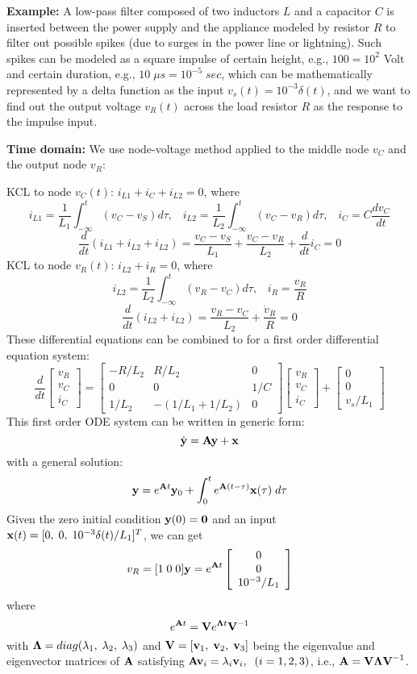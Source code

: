 {\bf Example:} A low-pass filter composed of two inductors $L$
and a capacitor $C$ is inserted between the power supply and the
appliance modeled by resistor $R$ to filter out possible spikes
(due to surges in the power line or lightning). Such spikes can 
be modeled as a square impulse of certain height, e.g., $100=10^2$
Volt and certain duration, e.g., $10 \;\mu s=10^{-5}\;sec$, which 
can be mathematically represented by a delta function as the input
$v_s(t)=10^{-3}\delta(t)$, and we want to find out the output voltage
$v_R(t)$ across the load resistor $R$ as the response to the impulse
input. 


{\bf Time domain:} We use node-voltage method applied
to the middle node $v_C$ and the output node $v_R$:

KCL to node $v_C(t)$: $i_{L1}+i_C+i_{L2}=0$, where
\[
i_{L1}=\frac{1}{L_1}\int_{-\infty}^t (v_C-v_S)d\tau,\;\;\;
i_{L2}=\frac{1}{L_2}\int_{-\infty}^t (v_C-v_R)d\tau,\;\;\;
i_C=C\frac{dv_C}{dt}
\]
\[
\frac{d}{dt}(i_{L1}+i_{L2}+i_{L2})
=\frac{v_C-v_S}{L_1}+\frac{v_C-v_R}{L_2}+\frac{d}{dt}i_C=0
\]
KCL to node $v_R(t)$: $i_{L2}+i_R=0$, where
\[
i_{L2}=\frac{1}{L_2}\int_{-\infty}^t (v_R-v_C)d\tau,\;\;\;
i_R=\frac{v_R}{R}
\]
\[
\frac{d}{dt}(i_{L2}+i_{L2})=\frac{v_R-v_C}{L_2}+\frac{\dot{v}_R}{R}=0
\]
These differential equations can be combined to for a first
order differential equation system:
\[
\frac{d}{dt}\left[\begin{array}{c}v_R\\v_C\\i_C\end{array}\right]
=\left[\begin{array}{ccc}-R/L_2&R/L_2&0\\0 & 0 & 1/C\\1/L_2&-(1/L_1+1/L_2)&0
\end{array}\right]
\left[\begin{array}{c}v_R\\v_C\\i_C\end{array}\right]
+\left[\begin{array}{c}0\\0\\v_s/L_1\end{array}\right]
\]
This first order ODE system can be written in generic form:
\[
\dot{\bf y}={\bf Ay}+{\bf x}
\]
with a general solution:
\[
{\bf y}=e^{{\bf A}t}{\bf y}_0+\int_0^t e^{{\bf A}(t-\tau)} {\bf x}(\tau)\;d\tau
\]
Given the zero initial condition ${\bf y}(0)={\bf 0}$ and an
input ${\bf x}(t)=[0,\;0,\;10^{-3}\delta(t)/L_1]^T$, we can get 
\[
v_R=[1\;0\;0]{\bf y}=e^{{\bf A}t}
\left[\begin{array}{c}0\\0\\10^{-3}/L_1\end{array}\right]
\]
where 
\[
e^{{\bf A}t}={\bf V}e^{{\bf\Lambda}t}{\bf V}^{-1}
\]
with ${\bf\Lambda}=diag(\lambda_1,\;\lambda_2,\;\lambda_3)$ and
${\bf V}=[{\bf v}_1,\;{\bf v}_2,\;{\bf v}_3]$ being the eigenvalue 
and eigenvector matrices of ${\bf A}$ satisfying 
${\bf Av}_i=\lambda_i{\bf v}_i,\;\;(i=1,2,3)$, i.e., 
${\bf A}={\bf V\Lambda V}^{-1}$.


